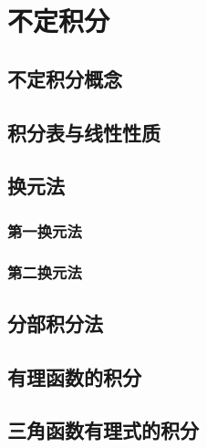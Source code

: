 

\chapter{不定积分}\label{ch:6}
\section{不定积分概念}
\begin{exercise}

\end{exercise}
\section{积分表与线性性质}
\begin{exercise}

\end{exercise}
\section{换元法}
\subsection{第一换元法}
\subsection{第二换元法}
\begin{exercise}

\end{exercise}
\section{分部积分法}
\begin{exercise}

\end{exercise}
\section{有理函数的积分}
\begin{exercise}

\end{exercise}
\section{三角函数有理式的积分}
\begin{exercise}

\end{exercise}
